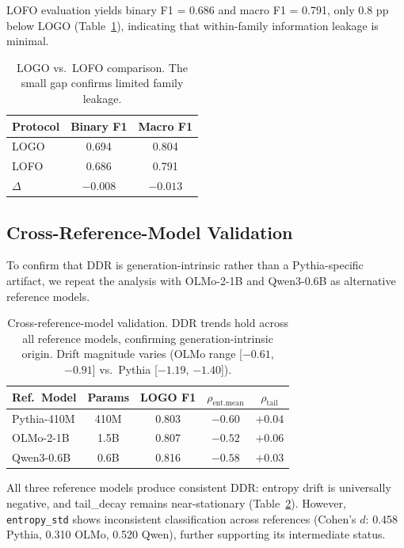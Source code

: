 \documentclass[11pt,a4paper]{article}
\begin{document}
LOFO evaluation yields binary F1 = 0.686 and macro F1 = 0.791, only 0.8 pp below LOGO (Table~\ref{tab:lofo}), indicating that within-family information leakage is minimal.

\begin{table}[t]
\centering
\small
\begin{tabular}{lcc}
\toprule
\textbf{Protocol} & \textbf{Binary F1} & \textbf{Macro F1} \\
\midrule
LOGO & 0.694 & 0.804 \\
LOFO & 0.686 & 0.791 \\
$\Delta$ & $-0.008$ & $-0.013$ \\
\bottomrule
\end{tabular}
\caption{LOGO vs.\ LOFO comparison. The small gap confirms limited family leakage.}
\label{tab:lofo}
\end{table}

\subsection{Cross-Reference-Model Validation}

To confirm that DDR is generation-intrinsic rather than a Pythia-specific artifact, we repeat the analysis with OLMo-2-1B and Qwen3-0.6B as alternative reference models.

\begin{table}[t]
\centering
\small
\begin{tabular}{lcccc}
\toprule
\textbf{Ref.\ Model} & \textbf{Params} & \textbf{LOGO F1} & \textbf{$\rho_\text{ent.mean}$} & \textbf{$\rho_\text{tail}$} \\
\midrule
Pythia-410M & 410M & 0.803 & $-0.60$ & $+0.04$ \\
OLMo-2-1B & 1.5B & 0.807 & $-0.52$ & $+0.06$ \\
Qwen3-0.6B & 0.6B & 0.816 & $-0.58$ & $+0.03$ \\
\bottomrule
\end{tabular}
\caption{Cross-reference-model validation. DDR trends hold across all reference models, confirming generation-intrinsic origin. Drift magnitude varies (OLMo range [$-0.61$, $-0.91$] vs.\ Pythia [$-1.19$, $-1.40$]).}
\label{tab:cross_ref}
\end{table}

All three reference models produce consistent DDR: entropy drift is universally negative, and tail\_decay remains near-stationary (Table~\ref{tab:cross_ref}).
However, \texttt{entropy\_std} shows inconsistent classification across references (Cohen's $d$: 0.458 Pythia, 0.310 OLMo, 0.520 Qwen), further supporting its intermediate status.
\end{document}
